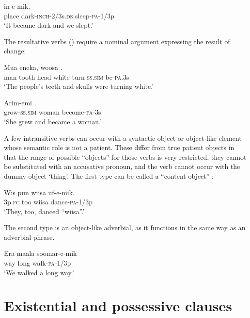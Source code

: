 \ea%
\label{ex:5:x1021}
\gll {}   in-e-mik. \\
     place  dark-\textsc{inch}-2/3s.\textsc{ds}  sleep-\textsc{pa}-1/3p \\
\glt `It became dark and we slept.'
\z

The resultative verbs () require a nominal argument expressing the result of change: 

\ea%
\label{ex:5:x963}
\gll Mua  eneka,  woosa   . \\
     man  tooth  head  white  turn-\textsc{ss}.\textsc{sim}-be-\textsc{pa}.3s \\
\glt `The people's teeth and skulls were turning white.'
\z

\ea%
\label{ex:5:x966}
\gll Arim-emi   . \\
     grow-\textsc{ss}.\textsc{sim}  woman  become-\textsc{pa}-3s \\
\glt `She grew and became a woman.'
\z

A few intransitive verbs can occur with a syntactic object or object-like element whose semantic role is not a patient. These differ from true patient objects in that the range of possible ``objects'' for those verbs is very restricted, they cannot be substituted with an accusative pronoun, and the verb cannot occur with the dummy object  `thing'. The first type can be called a ``content object'' \citep[179]{HakulinenEtAl1979}%
: 

\ea%
\label{ex:5:x308}
\gll Wis  pun  wiisa  uf-e-mik. \\
     3p.\textsc{fc}  too  wiisa  dance-\textsc{pa}-1/3p \\
\glt `They, too, danced ``wiisa''.'
\z

The second type is an object-like adverbial, as it functions in the same way as an adverbial phrase.

\ea%
\label{ex:5:x307}
\gll Era  maala  soomar-e-mik \\
     way  long  walk-\textsc{pa}-1/3p \\
\glt `We walked a long way.'
\z

\section{Existential and possessive clauses}

